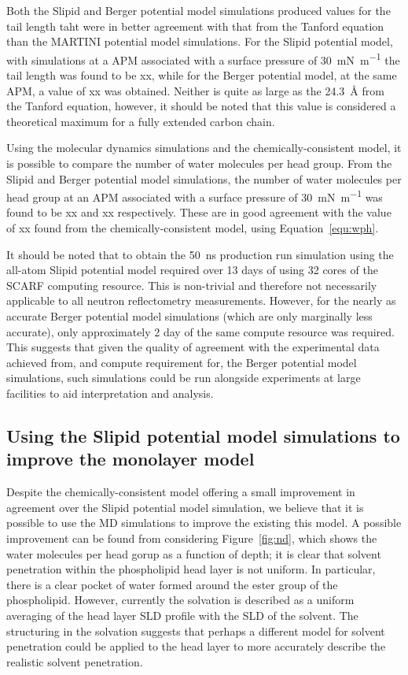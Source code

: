Both the Slipid and Berger potential model simulations produced values for the tail length taht were in better agreement with that from the Tanford equation than the MARTINI potential model simulations.
For the Slipid potential model, with simulations at a APM associated with a surface pressure of \SI{30}{\milli\newton\per\meter} the tail length was found to be xx, while for the Berger potential model, at the same APM, a value of xx was obtained.
Neither is quite as large as the \SI{24.3}{\angstrom} from the Tanford equation, however, it should be noted that this value is considered a theoretical maximum for a fully extended carbon chain.

Using the molecular dynamics simulations and the chemically-consistent model, it is possible to compare the number of water molecules per head group.
From the Slipid and Berger potential model simulations, the number of water molecules per head group at an APM associated with a surface pressure of \SI{30}{\milli\newton\per\meter} was found to be xx and xx respectively.
These are in good agreement with the value of xx found from the chemically-consistent model, using Equation~\ref{equ:wph}.

It should be noted that to obtain the \SI{50}{\nano\second} production run simulation using the all-atom Slipid potential model required over 13 days of using 32 cores of the SCARF computing resource.
This is non-trivial and therefore not necessarily applicable to all neutron reflectometry measurements.
However, for the nearly as accurate Berger potential model simulations (which are only marginally less accurate), only approximately 2 day of the same compute resource was required.
This suggests that given the quality of agreement with the experimental data achieved from, and compute requirement for, the Berger potential model simulations, such simulations could be run alongside experiments at large facilities to aid interpretation and analysis.

\subsection{Using the Slipid potential model simulations to improve the monolayer model}
Despite the chemically-consistent model offering a small improvement in agreement over the Slipid potential model simulation, we believe that it is possible to use the MD simulations to improve the existing this model.
A possible improvement can be found from considering Figure~\ref{fig:nd}, which shows the water molecules per head gorup as a function of depth; it is clear that solvent penetration within the phospholipid head layer is not uniform.
In particular, there is a clear pocket of water formed around the ester group of the phospholipid.
However, currently the solvation is described as a uniform averaging of the head layer SLD profile with the SLD of the solvent.
The structuring in the solvation suggests that perhaps a different model for solvent penetration could be applied to the head layer to more accurately describe the realistic solvent penetration.

